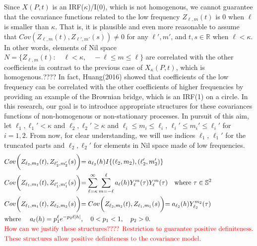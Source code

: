 \documentclass[11pt]{article}
\begin{document}
\begin{itemize}
{\begin{align*}
\end{align*}
}
\\
Since $X(P,t)$ is an IRF($\kappa$)/I(0), which is not homogenous, we cannot guarantee that the covariance functions related to the low frequency $Z_{\ell, m}(t)$ is 0 when $\ell$ is smaller than $\kappa$. That is, it is plausible and even more reasonable to assume that $Cov(Z_{\ell,m}(t), Z_{\ell',m'}(s)) \ne 0$ for any $\ell', m'$, and $t,s \in \mathbb{R}$ when $\ell<\kappa$. In other words, elements of Nil space $N=\{Z_{\ell,m}(t) : \quad \ell<\kappa, \quad -\ell \le m \le \ell\}$ are correlated with the other coefficients in contrast to the previous case of $X_\kappa(P,t)$, which is homogenous.{\color{red}????} In fact, Huang(2016) showed that coefficients of the low frequency can be correlated with the other coefficients of higher frequencies by providing an example of the Brownian bridge, which is an IRF(1) on a circle. In this research, our goal is to introduce appropriate structures for these covariances functions of non-homogenous or non-stationary processes. In pursuit of this aim, let $\ell_1, \ell_1' < \kappa$ and $\ell_2, \ell _2' \ge \kappa$ and $\ell_i \le m_i \le \ell_i$, $\ell_i' \le m_i' \le \ell_i'$ for $i=1,2$. From now, for clear understanding, we will use indices $\ell_1$, $\ell_1'$ for the truncated parts and $\ell_2,\ell_2'$ for elements in Nil space made of low frequencies.\\
\begin{align*}
&Cov\biggl( Z_{\ell_2,m_2}(t), Z_{\ell_2',m_2'}(s) \biggl) = a_{\ell_2}(h) I\{(\ell_2,m_2),(\ell'_2,m_2')\} \\
&Cov\biggl( Z_{\ell_1,m_1}(t), Z_{\ell_1',m_1'}(s) \biggl) = \sum_{\ell=\kappa}^{\infty} \sum_{m=-\ell}^{\ell} a_{\ell}(h) Y_{\ell}^{m}(\tau) Y_{\ell}^{m}(\tau)  \quad \text{where } \tau \in \mathbb{S}^2 \\
&Cov\biggl( Z_{\ell_1,m_1}(t), Z_{\ell_2,m_2}(s) \biggl) = Cov\biggl( Z_{\ell_2,m_2}(t), Z_{\ell_1,m_1}(s) \biggl) = a_{\ell_2}(h) Y_{\ell_2}^{m_2}(\tau)\\
&\text{where } \quad a_\ell(h)=p_1^\ell e^{-p_2 \ell |h|}, \quad 0<p_1<1, \quad p_2>0.\\
&\text{\color{red} How can we justify these structures???? Restriction to guarantee positive definiteness.}\\
&\text{\color{red} These structures allow positive definiteness to the covariance model.}\\
\end{align*}



\end{itemize}
\end{document}
